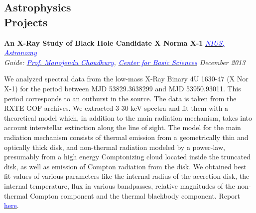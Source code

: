 \documentclass[margin,line]{res}
\newenvironment{list1}{
  \begin{list}{\ding{113}}{%
      \setlength{\itemsep}{0in}
      \setlength{\parsep}{0in} \setlength{\parskip}{0in}
      \setlength{\topsep}{0in} \setlength{\partopsep}{0in} 
      \setlength{\leftmargin}{0.17in}}}{\end{list}}
\begin{document}
\begin{resume}
\vspace*{-0.1in}

\section{\sc Astrophysics \\Projects}

{\bf An X-Ray Study of Black Hole Candidate X Norma X-1} \hfill \textit{\href{http://nius.hbcse.tifr.res.in/}{\textcolor{blue} {NIUS, Astronomy}}} \\
{\em Guide: \href{http://cbs.ac.in/people/visiting-scientists/manojendu-choudhury}{\textcolor{blue}{Prof. Manojendu Choudhury}}, \href{http://cbs.ac.in/}{\textcolor{blue} {Center for Basic Sciences}} \hfill December 2013} \\
\vspace*{-.15in}
\begin{list1}
\item[] We analyzed spectral data from the low-mass X-Ray Binary 4U 1630-47 (X Nor X-1) for the period between MJD 53829.3638299 and MJD 53950.93011. This period corresponds to an outburst in the source. The data is taken from the RXTE GOF archives. We extracted 3-30 keV spectra and fit them with a theoretical model which, in addition to the main radiation mechanism, takes into account interstellar extinction along the line of sight. The model for the main radiation mechanism consists of thermal emission from a geometrically thin and optically thick disk, and non-thermal radiation modeled by a power-law, presumably from a high energy Comptonizing cloud located inside the truncated disk, as well as emission of Compton radiation from the disk. We obtained best fit values of various parameters like the internal radius of the accretion disk, the internal temperature, flux in various bandpasses, relative magnitudes of the non-thermal Compton component and the thermal blackbody component. Report \href{https://alankarkotwal.github.io/4U_1630-47_Report.pdf}{\textcolor{blue} {here}}.
\end{list1}

\vspace*{-0.1in}


\end{resume}
\end{document}
